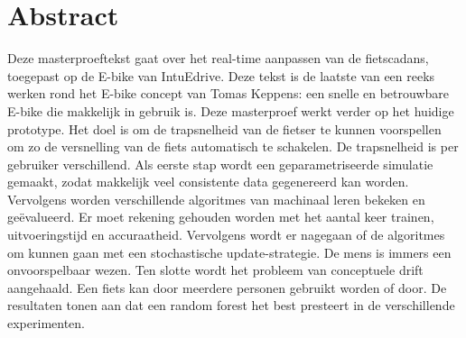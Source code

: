 \documentclass[12pt,a4paper,oneside]{book}
\makeatletter
\renewcommand{\algorithmcfname}{Algoritme}
\newcommand{\RemoveAlgoNumber}{\renewcommand{\fnum@algocf}{\AlCapSty{\AlCapFnt\algorithmcfname}}}
\makeatother
\begin{document}
\chapter{Abstract}
Deze masterproeftekst gaat over het real-time aanpassen van de fietscadans, toegepast op de E-bike van IntuEdrive. Deze tekst is de laatste van een reeks werken rond het E-bike concept van Tomas Keppens: een snelle en betrouwbare E-bike die makkelijk in gebruik is. Deze masterproef werkt verder op het huidige prototype. Het doel is om de trapsnelheid van de fietser te kunnen voorspellen om zo de versnelling van de fiets automatisch te schakelen. De trapsnelheid is per gebruiker verschillend. Als eerste stap wordt een geparametriseerde simulatie gemaakt, zodat makkelijk veel consistente data gegenereerd kan worden. Vervolgens worden verschillende algoritmes van machinaal leren bekeken en geëvalueerd. Er moet rekening gehouden worden met het aantal keer trainen, uitvoeringstijd en accuraatheid. Vervolgens wordt er nagegaan of de algoritmes om kunnen gaan met een stochastische update-strategie. De mens is immers een onvoorspelbaar wezen. Ten slotte wordt het probleem van conceptuele drift aangehaald. Een fiets kan door meerdere personen gebruikt worden of door. De resultaten tonen aan dat een random forest het best presteert in de verschillende experimenten.

\tableofcontents
\newpage
\listoffigures
{}
\listoftables
{}
\newpage
\printglossary[type=\acronymtype ,title=Lijst van afkortingen ,style=mystyle]
\newpage
{}
\printglossary[title=Lijst van symbolen,style=mystyle]

\mainmatter
{}
\RemoveAlgoNumber







\end{document}
